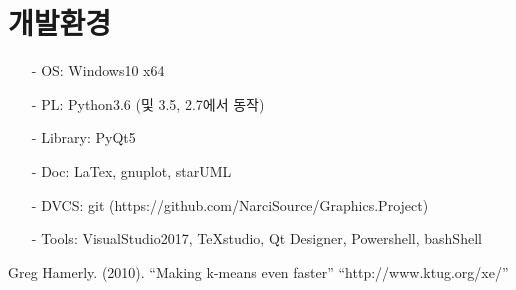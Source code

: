 \documentclass{oblivoir}
\begin{document}
\section{개발환경 \label{ss:add}}
\begin{enumerate}
	\item[-] OS: Windows10 x64
	\item[-] PL: Python3.6 (및 3.5, 2.7에서 동작)
	\item[-] Library: PyQt5
	\item[-] Doc: LaTex, gnuplot, starUML
	\item[-] DVCS: git (https://github.com/NarciSource/Graphics.Project)
	\item[-] Tools: VisualStudio2017, TeXstudio, Qt Designer, Powershell, bashShell
\end{enumerate}

\begin{thebibliography}{10}
	Greg Hamerly. (2010). ``Making k-means even faster''
	\bibitem``http://www.ktug.org/xe/''
\end{thebibliography}
\end{document}
